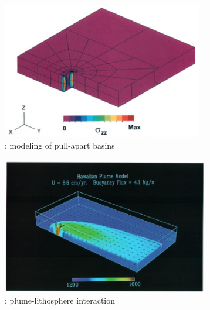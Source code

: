\begin{center}
\begin{minipage}{0.45\textwidth}
\centering
\includegraphics[height=6cm]{images/history/katl95}\\
{: modeling of pull-apart basins \cite{katl95}}
\end{minipage}\hfill
\begin{minipage}{0.45\textwidth}
\centering
\includegraphics[height=6cm]{images/history/rich94}\\
{: plume-lithosphere interaction \cite{rich94}}
\end{minipage}
\end{center}

